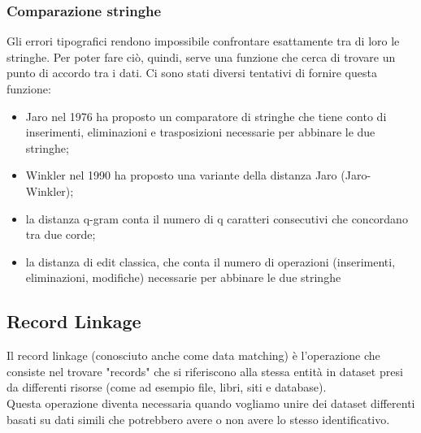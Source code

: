 \documentclass[a4paper,12pt]{article}
\begin{document}
\subsubsection{Comparazione stringhe}

Gli errori tipografici rendono impossibile confrontare esattamente tra di loro le stringhe.  Per poter fare ciò, quindi, serve una funzione che cerca di trovare un punto di accordo tra i dati. Ci sono stati diversi tentativi di fornire questa funzione:

\begin{itemize}
\item Jaro \cite{census/jaro76} nel 1976 ha proposto un comparatore di stringhe che tiene conto di inserimenti, eliminazioni e trasposizioni necessarie per abbinare le due stringhe;
\item Winkler \cite{winkler90} nel 1990 ha proposto una variante della distanza Jaro (Jaro-Winkler);
\item la distanza q-gram conta il numero di q caratteri consecutivi che concordano tra due corde;
\item la distanza di edit classica, che conta il numero di operazioni (inserimenti, eliminazioni, modifiche) necessarie per abbinare le due stringhe
\end{itemize}

\newpage
\subsection{Record Linkage}
Il record linkage (conosciuto anche come data matching) è l'operazione che consiste nel trovare "records" che si riferiscono alla stessa entità in dataset presi da differenti risorse (come ad esempio file, libri, siti e database). \\
\noindent Questa operazione diventa necessaria quando vogliamo unire dei dataset differenti basati su dati simili che potrebbero avere o non avere lo stesso identificativo. \\
\end{document}
